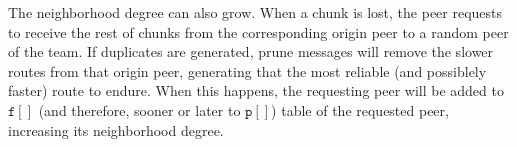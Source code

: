 The neighborhood degree can also grow. When a chunk is lost, the peer
requests to receive the rest of chunks from the corresponding origin
peer to a random peer of the team. If duplicates are generated, prune
messages will remove the slower routes from that origin peer,
generating that the most reliable (and possiblely faster) route to
endure. When this happens, the requesting peer will be added to
$\mathtt{f}[]$ (and therefore, sooner or later to
$\mathtt{p}[]$) table of the requested peer, increasing its
neighborhood degree.
